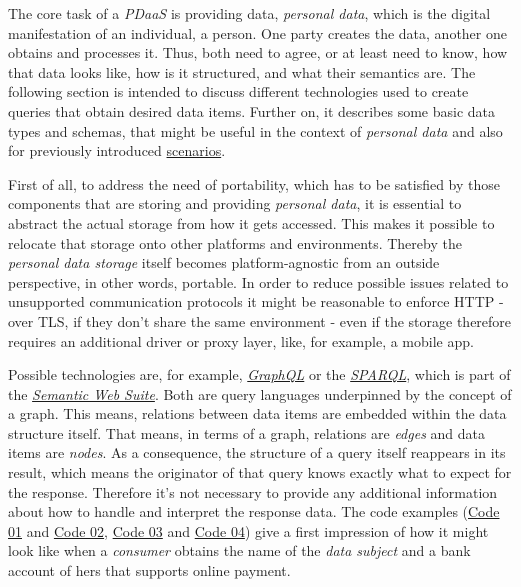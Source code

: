 \documentclass[12pt,english,a4paper,titlepage,cleardoublepage=empty,dottedtoc]{report}
\begin{document}
The core task of a \emph{PDaaS} is providing data, \emph{personal data},
which is the digital manifestation of an individual, a person. One party
creates the data, another one obtains and processes it. Thus, both need
to agree, or at least need to know, how that data looks like, how is it
structured, and what their semantics are. The following section is
intended to discuss different technologies used to create queries that
obtain desired data items. Further on, it describes some basic data
types and schemas, that might be useful in the context of \emph{personal
data} and also for previously introduced
\protect\hyperlink{scenarios}{scenarios}.

First of all, to address the need of portability, which has to be
satisfied by those components that are storing and providing
\emph{personal data}, it is essential to abstract the actual storage
from how it gets accessed. This makes it possible to relocate that
storage onto other platforms and environments. Thereby the
\emph{personal data storage} itself becomes platform-agnostic from an
outside perspective, in other words, portable. In order to reduce
possible issues related to unsupported communication protocols it might
be reasonable to enforce HTTP - over TLS, if they don't share the same
environment - even if the storage therefore requires an additional
driver or proxy layer, like, for example, a mobile app.

Possible technologies are, for example,
\emph{\protect\hyperlink{def--graphql}{GraphQL}} or the
\emph{\protect\hyperlink{def--sparql}{SPARQL}}, which is part of the
\emph{\protect\hyperlink{def--semantic-web}{Semantic Web Suite}}. Both
are query languages underpinned by the concept of a graph. This means,
relations between data items are embedded within the data structure
itself. That means, in terms of a graph, relations are \emph{edges} and
data items are \emph{nodes}. As a consequence, the structure of a query
itself reappears in its result, which means the originator of that query
knows exactly what to expect for the response. Therefore it's not
necessary to provide any additional information about how to handle and
interpret the response data. The code examples
(\protect\hyperlink{code-01_sparql-query}{Code 01} and
\protect\hyperlink{code-02_sparql-query-results}{Code 02},
\protect\hyperlink{code-03_graphql-query}{Code 03} and
\protect\hyperlink{code-04_graphql-query-result}{Code 04}) give a first
impression of how it might look like when a \emph{consumer} obtains the
name of the \emph{data subject} and a bank account of hers that supports
online payment.
\end{document}
